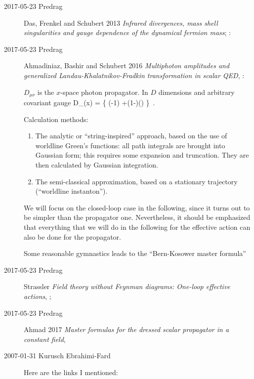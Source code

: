 \begin{description}
\item[2017-05-23 Predrag]

Das, Frenkel and Schubert 2013
{\em Infrared divergences, mass shell singularities and gauge dependence
of the dynamical fermion mass};
 :

\item[2017-05-23 Predrag]
Ahmadiniaz, Bashir and Schubert 2016
{\em Multiphoton amplitudes and generalized {Landau-Khalatnikov-Fradkin}
transformation in scalar {QED}},  	:

$D_{\mu\nu} $ is the $x$-space photon
propagator. In $D$ dimensions and arbitrary covariant gauge
\beq
D_{\mu\nu}(x) =
\Big\{
\Gamma\Big(-1\Big)
    +(1-\xi)\Gamma\Big(\Big)
\Big\}
\,.

Calculation methods:
\begin{enumerate}
  \item
The analytic or ``string-inspired'' approach, based on the use of
worldline Green's functions: all path integrals are brought into Gaussian
form; this requires some expansion and truncation. They are then
calculated by Gaussian integration.
  \item
The semi-classical approximation, based on a stationary trajectory
(``worldline instanton'').
\end{enumerate}
We will focus on the closed-loop case in the following, since it turns out to
be simpler than the propagator one. Nevertheless, it should be emphasized
that everything that we will do in the following for the effective action can
also be done for the propagator.

Some reasonable gymnastics leads to the ``Bern-Kosower master
formula''

\item[2017-05-23 Predrag]
Strassler
{\em Field theory without {Feynman} diagrams: {One}-loop effective actions},
;

\item[2017-05-23 Predrag]
Ahmad \etal{} 2017
{\em Master formulas for the dressed scalar propagator in a constant field},

\item[2007-01-31 Kurusch Ebrahimi-Fard]
 \label{sect:BrDeKr96}
Here are the links I mentioned:


\end{description}
